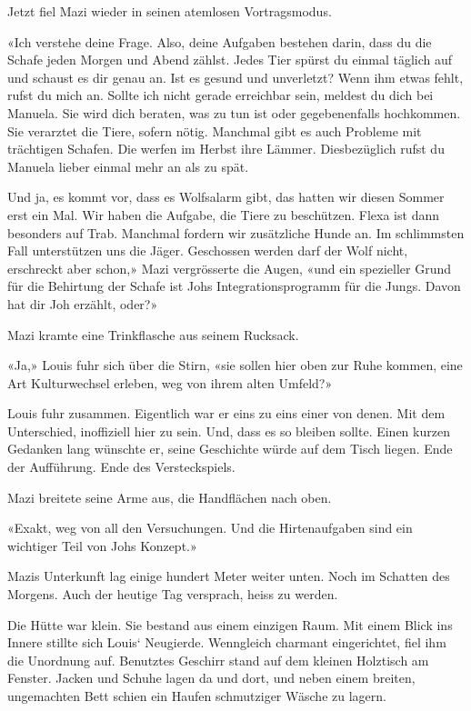Jetzt fiel Mazi wieder in seinen atemlosen Vortragsmodus.

«Ich verstehe deine Frage. Also, deine Aufgaben bestehen darin, dass du
die Schafe jeden Morgen und Abend zählst. Jedes Tier spürst du einmal
täglich auf und schaust es dir genau an. Ist es gesund und unverletzt?
Wenn ihm etwas fehlt, rufst du mich an. Sollte ich nicht gerade
erreichbar sein, meldest du dich bei Manuela. Sie wird dich beraten, was
zu tun ist oder gegebenenfalls hochkommen. Sie verarztet die Tiere,
sofern nötig. Manchmal gibt es auch Probleme mit trächtigen Schafen. Die
werfen im Herbst ihre Lämmer. Diesbezüglich rufst du Manuela lieber
einmal mehr an als zu spät.

Und ja, es kommt vor, dass es Wolfsalarm gibt, das hatten wir diesen
Sommer erst ein Mal. Wir haben die Aufgabe, die Tiere zu beschützen.
Flexa ist dann besonders auf Trab. Manchmal fordern wir zusätzliche
Hunde an. Im schlimmsten Fall unterstützen uns die Jäger. Geschossen
werden darf der Wolf nicht, erschreckt aber schon,» Mazi vergrösserte
die Augen, «und ein spezieller Grund für die Behirtung der Schafe ist
Johs Integrationsprogramm für die Jungs. Davon hat dir Joh erzählt,
oder?»

Mazi kramte eine Trinkflasche aus seinem Rucksack.

«Ja,» Louis fuhr sich über die Stirn, «sie sollen hier oben zur Ruhe
kommen, eine Art Kulturwechsel erleben, weg von ihrem alten Umfeld?»

Louis fuhr zusammen. Eigentlich war er eins zu eins einer von denen. Mit
dem Unterschied, inoffiziell hier zu sein. Und, dass es so bleiben
sollte. Einen kurzen Gedanken lang wünschte er, seine Geschichte würde
auf dem Tisch liegen. Ende der Aufführung. Ende des Versteckspiels.

Mazi breitete seine Arme aus, die Handflächen nach oben.

«Exakt, weg von all den Versuchungen. Und die Hirtenaufgaben sind ein
wichtiger Teil von Johs Konzept.»

Mazis Unterkunft lag einige hundert Meter weiter unten. Noch im Schatten
des Morgens. Auch der heutige Tag versprach, heiss zu werden.

Die Hütte war klein. Sie bestand aus einem einzigen Raum. Mit einem
Blick ins Innere stillte sich Louis` Neugierde. Wenngleich charmant
eingerichtet, fiel ihm die Unordnung auf. Benutztes Geschirr stand auf
dem kleinen Holztisch am Fenster. Jacken und Schuhe lagen da und dort,
und neben einem breiten, ungemachten Bett schien ein Haufen schmutziger
Wäsche zu lagern.

